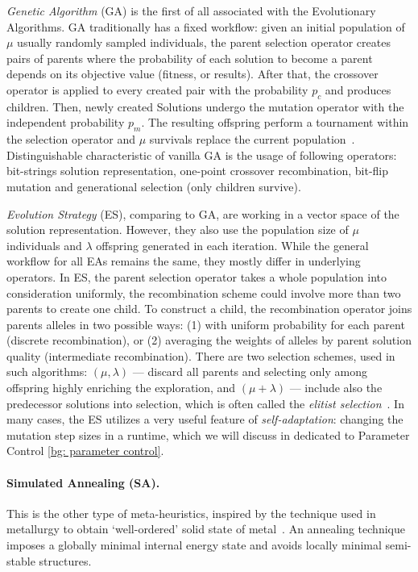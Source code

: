 \emph{Genetic Algorithm} (GA) is the first of all associated with the Evolutionary Algorithms. GA traditionally has a fixed workflow: given an initial population of $\mu$ usually randomly sampled individuals, the parent selection operator creates pairs of parents where the probability of each solution to become a parent depends on its objective value (fitness, or results). After that, the crossover operator is applied to every created pair with the probability $p_c$ and produces children. Then, newly created Solutions undergo the mutation operator with the independent probability $p_m$. The resulting offspring perform a tournament within the selection operator and $\mu$ survivals replace the current population~\cite{eiben2015popular}. Distinguishable characteristic of vanilla GA is the usage of following operators: bit-strings solution representation, one-point crossover recombination, bit-flip mutation and generational selection (only children survive).

\emph{Evolution Strategy} (ES), comparing to GA, are working in a vector space of the solution representation. However, they also use the population size of $\mu$ individuals and $\lambda$ offspring generated in each iteration. While the general workflow for all EAs remains the same, they mostly differ in underlying operators. In ES, the parent selection operator takes a whole population into consideration uniformly, the recombination scheme could involve more than two parents to create one child. To construct a child, the recombination operator joins parents alleles in two possible ways: (1) with uniform probability for each parent (discrete recombination), or (2) averaging the weights of alleles by parent solution quality (intermediate recombination). There are two selection schemes, used in such algorithms: $(\mu,\lambda)$ — discard all parents and selecting only among offspring highly enriching the exploration, and $(\mu+\lambda)$ — include also the predecessor solutions into selection, which is often called the \textit{elitist selection}~\cite{eiben2015popular}. In many cases, the ES utilizes a very useful feature of \emph{self-adaptation}: changing the mutation step sizes in a runtime, which we will discuss in dedicated to Parameter Control \cref{bg: parameter control}.

\paragraph{Simulated Annealing (SA).} This is the other type of meta-heuristics, inspired by the technique used in metallurgy to obtain `well-ordered' solid state of metal~\cite{van1987simulated}. An annealing technique imposes a globally minimal internal energy state and avoids locally minimal semi-stable structures. 

